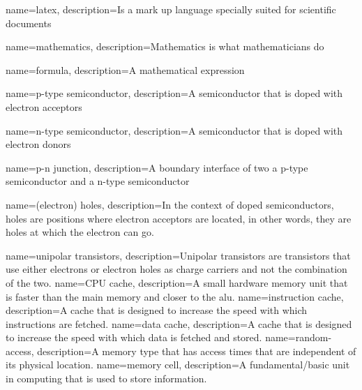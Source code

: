 {
        name=latex,
        description={Is a mark up language specially suited for
scientific documents}
}

{
        name=mathematics,
        description={Mathematics is what mathematicians do}
}

{
        name=formula,
        description={A mathematical expression}
}

{
        name=p-type semiconductor,
        description={A semiconductor that is doped with electron acceptors}
}

{
        name=n-type semiconductor,
        description={A semiconductor that is doped with electron donors}
}

{
        name=p-n junction,
        description={A boundary interface of two  a p-type semiconductor and a n-type semiconductor}
}

{
        name=(electron) holes,
        description={In the context of doped semiconductors, holes are positions where electron acceptors are located, in other words, they are holes at which the electron can go.}
}

{
        name=unipolar transistors,
        description={Unipolar transistors are transistors that use either electrons or electron holes as charge carriers and not the combination of the two.}
}
{
        name=CPU cache,
        description={A small hardware memory unit that is faster than the main memory and closer to the \acrlong{alu}.}
}
{
        name=instruction cache,
        description={A cache that is designed to increase the speed with which instructions are fetched.}
}
{
        name=data cache,
        description={A cache that is designed to increase the speed with which data is fetched and stored.}
}
{
        name=random-access,
        description={A memory type that has access times that are independent of its physical location.}
}
{
        name=memory cell,
        description={A fundamental/basic unit in computing that is used to store information.}
}

